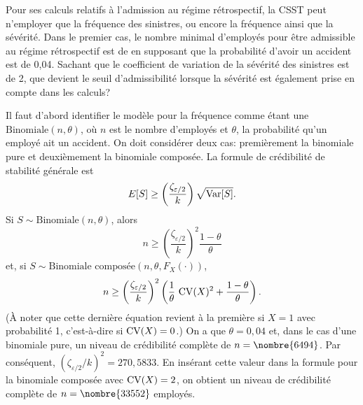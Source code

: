 \begin{exercice}
  Pour ses calculs relatifs à l'admission au régime rétrospectif, la
  CSST peut n'employer que la fréquence des sinistres, ou encore la
  fréquence ainsi que la sévérité. Dans le premier cas, le nombre
  minimal d'employés pour être admissible au régime rétrospectif est
  de  en supposant que la probabilité d'avoir un accident
  est de 0,04.  Sachant que le coefficient de variation de la sévérité
  des sinistres est de 2, que devient le seuil d'admissibilité
  lorsque la sévérité est également prise en compte dans les calculs?
  \begin{rep}
  \end{rep}
  \begin{sol}
    Il faut d'abord identifier le modèle pour la fréquence comme étant
    une $\text{Binomiale}(n, \theta)$, où $n$ est le nombre d'employés
    et $\theta$, la probabilité qu'un employé ait un accident. On doit
    considérer deux cas: premièrement la binomiale pure et deuxièmement
    la binomiale composée. La formule de crédibilité de stabilité
    générale est
    \begin{displaymath}
      E [ S ] \geq
      \left(
        \frac{\zeta_{\varepsilon/2}}{k}
      \right) \sqrt{\operatorname{Var} [ S ]}.
    \end{displaymath}
    Si $S \sim \text{Binomiale}(n, \theta)$, alors
    \begin{displaymath}
      n \geq
      \left(
        \frac{\zeta_{\varepsilon/2}}{k}
      \right)^2 \frac{1 - \theta}{\theta}
    \end{displaymath}
    et, si $S \sim \text{Binomiale composée}(n, \theta, F_X(\cdot))$,
    \begin{displaymath}
      n \geq
      \left(
        \frac{\zeta_{\varepsilon/2}}{k}
      \right)^2
      \left(
        \frac{1}{\theta}\, \operatorname{CV}(X)^2 +
        \frac{1 - \theta}{\theta}
      \right).
    \end{displaymath}
    (À noter que cette dernière équation revient à la première si $X =
    1$ avec probabilité 1, c'est-à-dire si $\operatorname{CV}(X) = 0$.) On a
    que $\theta = 0,04$ et, dans le cas d'une binomiale pure, un
    niveau de crédibilité complète de $n = \nombre{6494}$. Par
    conséquent, $(\zeta_{\varepsilon/2}/k)^2 = 270,5833$. En insérant
    cette valeur dans la formule pour la binomiale composée avec
    $\operatorname{CV}(X) = 2$, on obtient un niveau de crédibilité complète
    de $n = \nombre{33552}$ employés.
  \end{sol}
\end{exercice}

